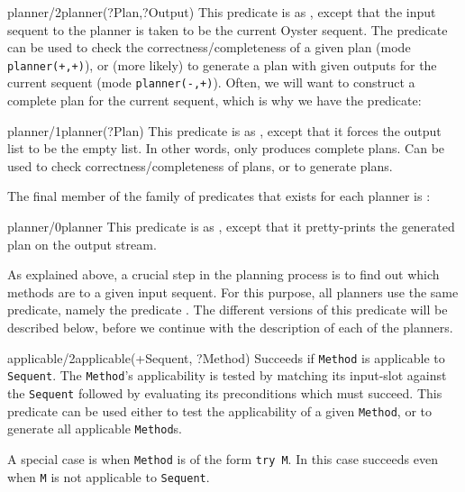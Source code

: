 \begin{predicate}{planner/2}{planner(?Plan,?Output)}%
This predicate is as , except that the input sequent
to the planner is taken to be the current Oyster sequent. The predicate can
be used to check the correctness/completeness of a given plan (mode
{\tt planner(+,+)}), or (more likely) to generate a plan with given
outputs for the current sequent (mode {\tt planner(-,+)}). Often, we
will want to construct a complete plan for the current sequent, which
is why we have the predicate:
\end{predicate}

\begin{predicate}{planner/1}{planner(?Plan)}%
This predicate is as , except that it forces the output
list to be the empty list. In other words,  only
produces complete plans. Can be used to check correctness/completeness
of plans, or to generate plans. 
\end{predicate}

The final member of the family of predicates that exists for each
planner is :

\begin{predicate}{planner/0}{planner}%
This predicate is as , except that it pretty-prints
the generated plan on the output stream. 
\end{predicate}

As explained above, a crucial step in the planning process is to find
out which methods are to a given input sequent.
For this purpose, all planners use the same predicate, namely the
predicate . The different versions of this
predicate will be described below, before we continue with the
description of each of the planners.

\begin{predicate}{applicable/2}{applicable(+Sequent, ?Method)}%
Succeeds if {\tt Method} is applicable to {\tt Sequent}. 
The {\tt Method}'s applicability is tested by
matching its input-slot against the {\tt Sequent} followed by 
evaluating its preconditions which must succeed.  This predicate can
be used either to test the applicability of a given {\tt Method}, or
to generate all applicable {\tt Method}s.

A special case is when {\tt Method} is of the form {\tt try M}.
In this case  succeeds even when {\tt M} is not
applicable to {\tt Sequent}.
\end{predicate}

